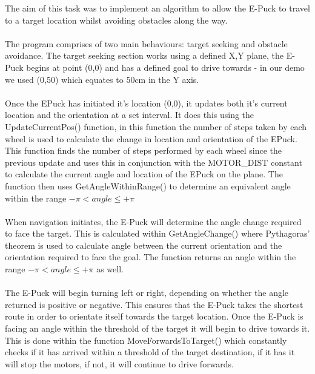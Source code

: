 \documentclass[11pt]{article}
\begin{document}
The aim of this task was to implement an algorithm to allow the E-Puck to travel to a target location whilst avoiding obstacles along the way. 
\\
\\
The program comprises of two main behaviours: target seeking and obstacle avoidance. The target seeking section works using a defined X,Y plane, the E-Puck begins at point (0,0) and has a defined goal to drive towards - in our demo we used (0,50) which equates to 50cm in the Y axis.
\\
\\
Once the E\-Puck has initiated it’s location (0,0), it updates both it’s current location and the orientation at a set interval. It does this using the UpdateCurrentPos() function, in this function the number of steps taken by each wheel is used to calculate the change in location and orientation of the E\-Puck. This function finds the number of steps performed by each wheel since the previous update and uses this in conjunction with the MOTOR\_DIST constant to calculate the current angle and location of the E\-Puck on the plane. The function then uses GetAngleWithinRange() to determine an equivalent angle within the range \begin{math}-\pi < angle \leq +\pi\end{math}
\\
\\
When navigation initiates, the E-Puck will determine the angle change required to face the target. This is calculated within GetAngleChange() where Pythagoras’ theorem is used to calculate angle between the current orientation and the orientation required to face the goal. The function returns an angle within the range \begin{math}-\pi < angle \leq +\pi\end{math} as well.
\\
\\
The E-Puck will begin turning left or right, depending on whether the angle returned is positive or negative. This ensures that the E-Puck takes the shortest route in order to orientate itself towards the target location. Once the E-Puck is facing an angle within the threshold of the target it will begin to drive towards it. This is done within the function MoveForwardsToTarget() which constantly checks if it has arrived within a threshold of the target destination, if it has it will stop the motors, if not, it will continue to drive forwards.
\\
\\
\end{document}

